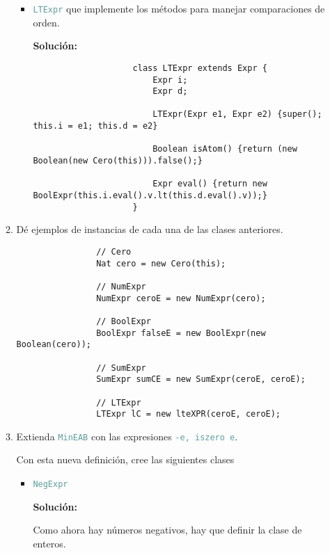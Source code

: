 \documentclass{article}
\newcommand{\tx}[1]{\textcolor{CadetBlue} {\texttt{#1}}}
\newcommand{\tb}[1]{\textcolor{RoyalPurple} {\textbf{#1}}}
\begin{document}
\begin{enumerate}
\begin{enumerate}
\begin{itemize}
                \item \tx{LTExpr} que implemente los métodos para manejar 
                comparaciones de orden.

                \tb{Solución:}

                \begin{verbatim}
                    class LTExpr extends Expr {
                        Expr i;
                        Expr d;

                        LTExpr(Expr e1, Expr e2) {super(); this.i = e1; this.d = e2}

                        Boolean isAtom() {return (new Boolean(new Cero(this))).false();}

                        Expr eval() {return new BoolExpr(this.i.eval().v.lt(this.d.eval().v));}
                    }
                \end{verbatim}

            \end{itemize}

            \item Dé ejemplos de instancias de cada una de las clases 
            anteriores.

            \begin{verbatim}
                // Cero
                Nat cero = new Cero(this);

                // NumExpr
                NumExpr ceroE = new NumExpr(cero);

                // BoolExpr
                BoolExpr falseE = new BoolExpr(new Boolean(cero));

                // SumExpr
                SumExpr sumCE = new SumExpr(ceroE, ceroE);

                // LTExpr
                LTExpr lC = new lteXPR(ceroE, ceroE);
            \end{verbatim}

            \item Extienda \tx{MinEAB} con las expresiones \tx{-e, iszero e}.

            Con esta nueva definición, cree las siguientes clases
            
            \begin{itemize}
                \item \tx{NegExpr}

                \tb{Solución:}

                Como ahora hay números negativos, hay que definir la clase de
                enteros.


\end{itemize}
\end{enumerate}
\end{enumerate}
\end{document}
